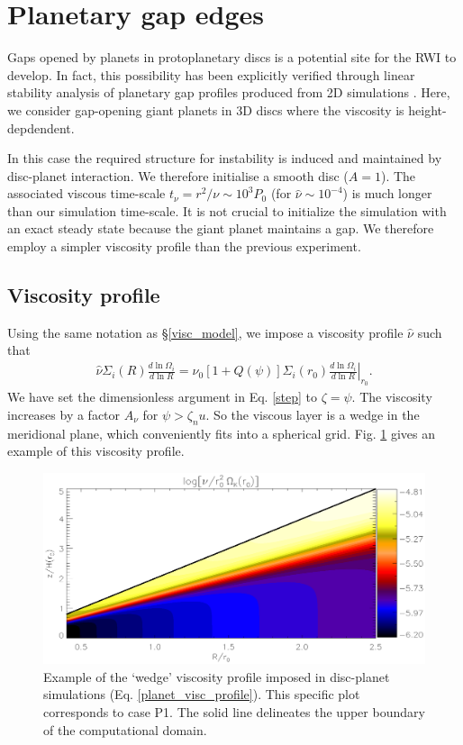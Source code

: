 \section{Planetary gap edges}
Gaps opened by planets in protoplanetary discs is a potential site for the  
RWI to develop. In fact, this possibility has been explicitly verified through 
linear stability analysis of planetary gap profiles 
produced from 2D simulations \citep{valborro07,lin10}. Here, we
consider gap-opening giant planets in 3D discs where the viscosity is
height-depdendent. 

In this case the required structure for instability is induced and
maintained by disc-planet interaction. We therefore initialise a
smooth disc ($A=1$). The associated viscous time-scale
$t_\nu=r^2/\nu\sim 10^3P_0$ (for $\hat{\nu}\sim 10^{-4}$) is much
longer than our simulation time-scale. It is not crucial to initialize
the simulation with an exact steady state because the giant planet
maintains a  gap. We therefore employ a simpler viscosity profile than
the previous experiment.   

\subsection{Viscosity profile}\label{planet_visc_mode}
Using the same notation as \S\ref{visc_model}, we impose a viscosity
profile $\hat{\nu}$ such that 
\begin{align}\label{planet_visc_profile}
  \hat{\nu}\Sigma_i(R)\frac{d\ln{\Omega_i}}{d\ln{R}} =
  \hat{\nu}_0\left[1+Q(\psi)\right]\Sigma_i(r_0)\left.\frac{d\ln{\Omega_i}}{d\ln{R}}\right|_{r_0}. 
\end{align}
We have set the dimensionless argument in Eq. \ref{step} to
$\zeta=\psi$. The viscosity increases by a factor $A_\nu$ for 
$\psi > \zeta_nu$. So the viscous layer is
a wedge in the meridional plane, which conveniently fits into a 
spherical grid. Fig. \ref{planet_visc2d} gives an example of this
viscosity profile.  

\begin{figure}
  \centering
  \includegraphics[width=\linewidth]{figures/pdisk_visc2d_planet}
  \caption{Example of the `wedge' viscosity profile
    imposed in disc-planet simulations (Eq. \ref{planet_visc_profile}). This specific plot
    corresponds to case P1. The solid line
    delineates the upper boundary of the computational domain.
    \label{planet_visc2d}}
\end{figure}

